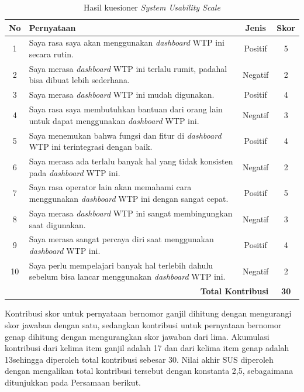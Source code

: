 \begin{table}[H]
\centering
\caption{Hasil kuesioner \textit{System Usability Scale}}
\label{tab:sus}
\renewcommand{\arraystretch}{1.3}
\begin{tabular}{|c|p{9cm}|c|c|}
\hline
\textbf{No} & \textbf{Pernyataan} & \textbf{Jenis} & \textbf{Skor} \\ \hline
1 & Saya rasa saya akan menggunakan \textit{dashboard} WTP ini secara rutin. & Positif & 5 \\ \hline
2 & Saya merasa \textit{dashboard} WTP ini terlalu rumit, padahal bisa dibuat lebih sederhana. & Negatif & 2 \\ \hline
3 & Saya merasa \textit{dashboard} WTP ini mudah digunakan. & Positif & 4 \\ \hline
4 & Saya rasa saya membutuhkan bantuan dari orang lain untuk dapat menggunakan \textit{dashboard} WTP ini. & Negatif & 3 \\ \hline
5 & Saya menemukan bahwa fungsi dan fitur di \textit{dashboard} WTP ini terintegrasi dengan baik. & Positif & 4 \\ \hline
6 & Saya merasa ada terlalu banyak hal yang tidak konsisten pada \textit{dashboard} WTP ini. & Negatif & 2 \\ \hline
7 & Saya rasa operator lain akan memahami cara menggunakan \textit{dashboard} WTP ini dengan sangat cepat. & Positif & 5 \\ \hline
8 & Saya merasa \textit{dashboard} WTP ini sangat membingungkan saat digunakan. & Negatif & 3 \\ \hline
9 & Saya merasa sangat percaya diri saat menggunakan \textit{dashboard} WTP ini. & Positif & 4 \\ \hline
10 & Saya perlu mempelajari banyak hal terlebih dahulu sebelum bisa lancar menggunakan \textit{dashboard} WTP ini. & Negatif & 2 \\ \hline
\multicolumn{3}{|r|}{\textbf{Total Kontribusi}} & \textbf{30} \\ \hline
\end{tabular}
\end{table}

Kontribusi skor untuk pernyataan bernomor ganjil dihitung dengan mengurangi skor jawaban dengan satu, sedangkan 
kontribusi untuk pernyataan bernomor genap dihitung dengan mengurangkan skor jawaban dari lima. Akumulasi 
kontribusi dari kelima item ganjil adalah 17 dan dari kelima item genap adalah 13sehingga diperoleh total 
kontribusi sebesar 30. Nilai akhir SUS diperoleh dengan mengalikan total kontribusi tersebut dengan konstanta 
2,5, sebagaimana ditunjukkan pada Persamaan berikut.

